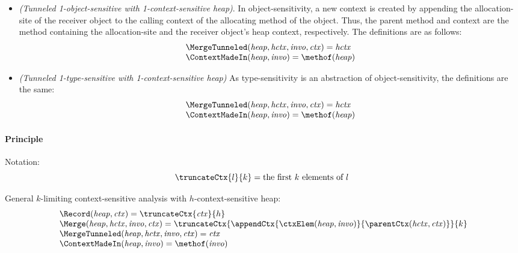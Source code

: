 {\begin{itemize}
\item {\it \oneobjHT (Tunneled 1-object-sensitive with
    1-context-sensitive heap)}. 
In object-sensitivity, a new context is created by appending the
allocation-site of the receiver object to the calling context of the
allocating method of the object. Thus, the parent method and context
are the method containing the allocation-site and the receiver object's heap
context, respectively. The definitions are as follows: 
\[
\begin{array}{l}
\MergeTunneled ({\it heap, hctx, invo, ctx}) = {\it hctx} \\
\ContextMadeIn ({\it heap}, {\it invo}) = \methof({\it heap})
\end{array}
\]

\item {\it \onetypeHT (Tunneled 1-type-sensitive with
    1-context-sensitive heap)}
As type-sensitivity is an abstraction of object-sensitivity, the
definitions are the same: 
\[
\begin{array}{l}
\MergeTunneled ({\it heap, hctx, invo, ctx}) = {\it hctx} \\
\ContextMadeIn ({\it heap}, {\it invo}) = \methof({\it heap})
\end{array}
\]

\end{itemize}

\newpage
\paragraph{Principle}

Notation:
\[
\truncateCtx{l}{k} = \mbox{the first $k$ elements of $l$ }
\]

General $k$-limiting context-sensitive analysis with
$h$-context-sensitive heap: 
\[
\begin{array}{l}
\Record ({\it heap}, {\it ctx}) =  \truncateCtx{{\it ctx}}{h} \\
\Merge ({\it heap, hctx, invo, ctx}) =
  \truncateCtx{\appendCtx{{\ctxElem({\it heap},{\it
  invo})}}{{ \parentCtx({\it hctx},{\it ctx})}}}{k} \\
\MergeTunneled ({\it heap, hctx, invo, ctx}) = {\it ctx} \\
\ContextMadeIn ({\it heap}, {\it invo}) = \methof({\it invo})
\end{array}
\]

}

